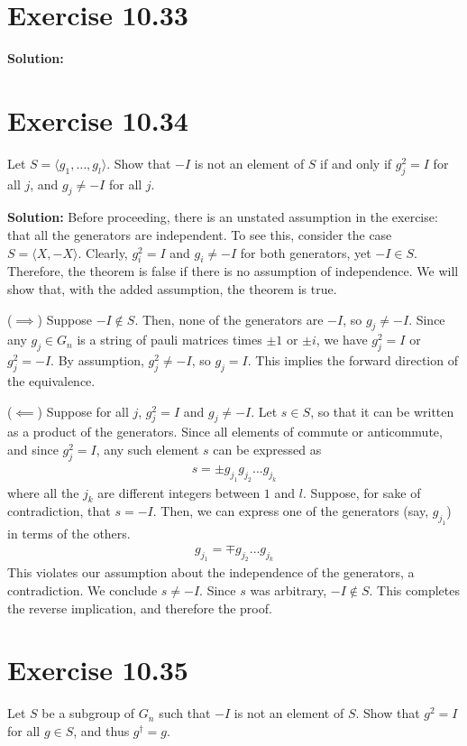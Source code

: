 \documentclass{book}
\begin{document}
\section*{Exercise 10.33}
    \textbf{Solution:}
    
\section*{Exercise 10.34}
    Let $S = \langle g_1,\dots,g_l\rangle$. Show that $-I$ is not an element of $S$ if and only if $g_j^2 =I$ for all $j$, and $g_j \neq -I$ for all $j$.
    
    \textbf{Solution:} Before proceeding, there is an unstated assumption in the exercise: that all the generators are independent. To see this, consider the case $S = \langle X, -X \rangle$. Clearly, $g_i^2 = I$ and $g_i \neq -I$ for both generators, yet $-I \in S$. Therefore, the theorem is false if there is no assumption of independence. We will show that, with the added assumption, the theorem is true.
    
    ($\implies$) Suppose $-I \notin S$. Then, none of the generators are $-I$, so $g_j \neq -I$. Since any $g_j \in G_n$ is a string of pauli matrices times $\pm 1$ or $\pm i$, we have $g_j^2 = I$ or $g_j^2 = -I$. By assumption, $g_j^2 \neq -I$, so $g_j = I$. This implies the forward direction of the equivalence.
    
    ($\impliedby$) Suppose for all $j$, $g_j^2 = I$ and $g_j \neq -I$. Let $s \in S$, so that it can be written as a product of the generators. Since all elements of commute or anticommute, and since $g_j^2 = I$, any such element $s$ can be expressed as 
    \begin{align}
        s = \pm g_{j_1}g_{j_2}\dots g_{j_k}
    \end{align}
    where all the $j_k$ are different integers between $1$ and $l$. Suppose, for sake of contradiction, that $s = -I$. Then, we can express one of the generators (say, $g_{j_1}$) in terms of the others.
    \begin{align}
        g_{j_1} = \mp g_{j_2}\dots g_{j_k}
    \end{align}
    This violates our assumption about the independence of the generators, a contradiction. We conclude $s \neq -I$. Since $s$ was arbitrary, $-I \notin S$. This completes the reverse implication, and therefore the proof.
    
\section*{Exercise 10.35}
    Let $S$ be a subgroup of $G_n$ such that $-I$ is not an element of $S$. Show that $g^2 =I$ for all $g\in S$, and thus $g^\dagger = g$.
    
\end{document}
